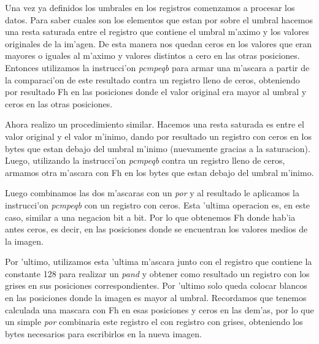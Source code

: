 Una vez ya definidos los umbrales en los registros comenzamos a procesar los datos. Para saber cuales son los elementos que estan por
sobre el umbral hacemos una resta saturada entre el registro que contiene el umbral m'aximo y los valores originales de la im'agen. De esta manera nos quedan ceros en los valores que eran mayores o iguales al m'aximo y valores distintos a cero en las otras posiciones. Entonces utilizamos 
la instrucci'on \textit{pcmpeqb} para armar una m'ascara a partir de la comparaci'on de este resultado contra un registro lleno de ceros, obteniendo por resultado Fh en las posiciones donde el valor original era mayor al umbral y ceros en las otras posiciones.

Ahora realizo un procedimiento similar. Hacemos una resta saturada es entre el valor original y el valor m'inimo, dando por resultado un registro con ceros en los bytes que estan debajo del umbral m'inimo (nuevamente gracias a la saturacion). Luego, utilizando la instrucci'on \textit{pcmpeqb} contra un registro lleno de ceros, armamos otra m'ascara con Fh en los bytes que estan debajo del umbral m'inimo.

Luego combinamos las dos m'ascaras con un \textit{por} y al resultado le aplicamos la instrucci'on \textit{pcmpeqb} con
un registro con ceros. Esta 'ultima operacion es, en este caso, similar a una negacion bit a bit. Por lo que obtenemos Fh donde hab'ia antes ceros, es decir, en las posiciones donde se encuentran los valores medios de la imagen.

Por 'ultimo, utilizamos esta 'ultima m'ascara junto con el registro que contiene la constante 128 para realizar un \textit{pand} y obtener como resultado un registro con los grises en sus posiciones correspondientes. Por 'ultimo solo queda colocar blancos en las posiciones donde la imagen es mayor al umbral. Recordamos que tenemos calculada una mascara con Fh en esas posiciones y ceros en las dem'as, por lo que un simple \textit{por} combinaria este registro el con registro con grises, obteniendo los bytes necesarios para escribirlos en la nueva imagen.